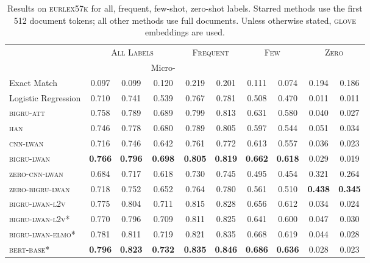 \documentclass[11pt,a4paper]{article}
\newcommand{\bigruatt}{\textsc{bigru-att}\xspace}
\newcommand{\han}{\textsc{han}\xspace}
\newcommand{\lwancnn}{\textsc{cnn-lwan}\xspace}
\newcommand{\zlwancnn}{\textsc{zero-cnn-lwan}\xspace}
\newcommand{\lwangru}{\textsc{bigru-lwan}\xspace}
\newcommand{\lwangrulv}{\textsc{bigru-lwan-l2v}}
\newcommand{\lwangruelmo}{\textsc{bigru-lwan-elmo}}
\newcommand{\zlwangru}{\textsc{zero-bigru-lwan}\xspace}
\newcommand{\glove}{\textsc{glove}\xspace}
\newcommand{\bertbase}{\textsc{bert-base}\xspace}
\newcommand{\newdata}{\textsc{eurlex57k}\xspace}
\begin{document}
\begin{table*}[ht!]
\centering
{
\footnotesize\addtolength{\tabcolsep}{-2pt}
\begin{tabular}{lccccccccc}
  \hline
  & \multicolumn{3}{c}{\textsc{All Labels}} & \multicolumn{2}{c}{\textsc{Frequent}} & \multicolumn{2}{c}{\textsc{Few}} & \multicolumn{2}{c}{\textsc{Zero}} \\ 
  &  &  & Micro- &  &  &  &  &  &  \\
  \cline{2-10}
  Exact Match & 0.097 & 0.099 & 0.120 & 0.219 & 0.201 & 0.111 & 0.074 & 0.194 & 0.186 \\
  Logistic Regression & 0.710 & 0.741 & 0.539 & 0.767 & 0.781 & 0.508 & 0.470 & 0.011 & 0.011 \\
  \hline
  \bigruatt & 0.758 & 0.789 & 0.689 & 0.799 & 0.813 & 0.631 & 0.580 & 0.040 & 0.027\\
  \han & 0.746 & 0.778 & 0.680 & 0.789 & 0.805 & 0.597 & 0.544 & 0.051 & 0.034\\
  \hline
 \lwancnn & 0.716 & 0.746 & 0.642 & 0.761 & 0.772 & 0.613 & 0.557 & 0.036  & 0.023 \\
  \lwangru & \textbf{0.766} & \textbf{0.796} & \textbf{0.698} & \textbf{0.805} & \textbf{0.819} & \textbf{0.662} & \textbf{0.618} & 0.029 & 0.019\\
   \hline
  \zlwancnn & 0.684 & 0.717 & 0.618 & 0.730 & 0.745 & 0.495 & 0.454 & 0.321 & 0.264 \\
  \zlwangru & 0.718 & 0.752 & 0.652  & 0.764 & 0.780 & 0.561 & 0.510 & \textbf{0.438} & \textbf{0.345} \\
  \hline
  \hline
 \lwangrulv & 0.775 & 0.804 & 0.711 & 0.815 & 0.828 & 0.656 & 0.612  & 0.034 & 0.024 \\
\hline
\lwangrulv* & 0.770 & 0.796 & 0.709 & 0.811 & 0.825 & 0.641 & 0.600 & 0.047 & 0.030\\
\lwangruelmo* & 0.781 & 0.811 & 0.719 & 0.821 & 0.835 & 0.668 & 0.619 & 0.044 & 0.028\\
\bertbase * & \textbf{0.796} & \textbf{0.823} & \textbf{0.732} & \textbf{0.835} & \textbf{0.846} & \textbf{0.686} & \textbf{0.636} & 0.028 & 0.023\\
\hline
\end{tabular}
}
\caption{Results on \newdata for all, frequent, few-shot, zero-shot labels. Starred methods use the first 512 document tokens; all other methods use full documents. Unless otherwise stated, \glove embeddings are used.}
\vspace*{-4mm}
\label{tab:results}
\end{table*}
\end{document}
